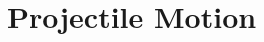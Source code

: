 %
%
%
%
%
%
%
%
%
%
%
%
%
%
%
%
%
%
%
%
%
%
%
%
%
%
%
%
%
%
%
%
%
%
%
%
%

\section{Projectile Motion}

